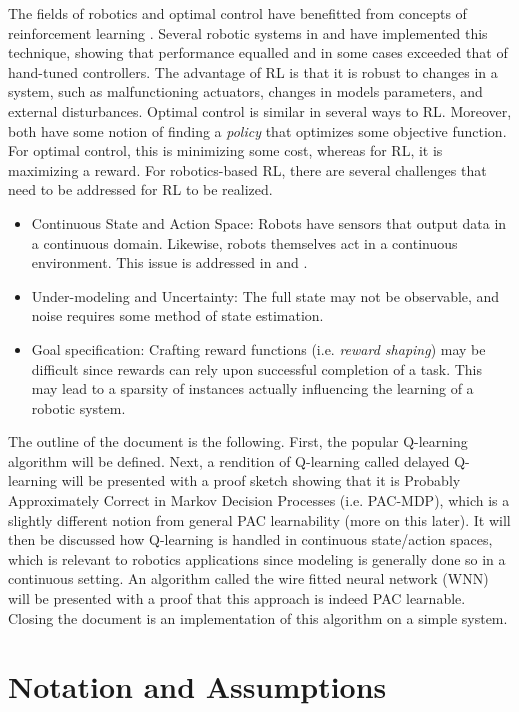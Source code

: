 \documentclass{article} %
\begin{document}
The fields of robotics and optimal control have benefitted from concepts of reinforcement learning \cite{kober_reinforcement_2013}\cite{kaelbling_reinforcement_1996}. Several robotic systems in  \cite{bhasin_reinforcement_2011} and \cite{hester_rtmba:_2012} have implemented this technique, showing that performance equalled and in some cases exceeded that of hand-tuned controllers. The advantage of RL is that it is robust to changes in a system, such as malfunctioning actuators, changes in models parameters, and external disturbances. Optimal control is similar in several ways to RL. Moreover, both have some notion of finding a \textit{policy} that optimizes some objective function. For optimal control, this is minimizing some cost, whereas for RL, it is maximizing a reward. For robotics-based RL, there are several challenges that need to be addressed for RL to be realized.
\begin{itemize}
\item Continuous State and Action Space: Robots have sensors that output data in a continuous domain.  Likewise, robots themselves act in a continuous environment. This issue is addressed in \cite{gaskett_thesis} and \cite{q_learning_navigation}.
\item Under-modeling and Uncertainty: The full state may not be observable, and noise requires some method of state estimation.
\item Goal specification: Crafting reward functions (i.e. \textit{reward shaping}) may be difficult since rewards can rely upon successful completion of a task. This may lead to a sparsity of instances actually influencing the learning of a robotic system.
\end{itemize}
The outline of the document is the following. First, the popular Q-learning algorithm will be  defined. Next, a rendition of Q-learning called delayed Q-learning will be presented with a proof sketch showing that it is Probably Approximately Correct in Markov Decision Processes (i.e. PAC-MDP), which is a slightly different notion from general PAC learnability (more on this later). It will then be discussed how Q-learning is handled in continuous state/action spaces, which is relevant to robotics applications since modeling is generally done so in a continuous setting. An algorithm called the wire fitted neural network (WNN) will be presented with a proof that this approach is indeed PAC learnable. Closing the document is an implementation of this algorithm on a simple system.

\section{Notation and Assumptions}
\end{document}
